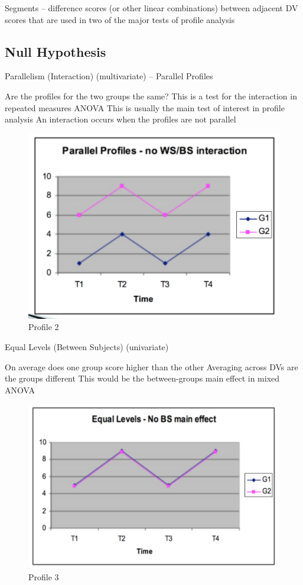 \documentclass[]{book}
\theoremstyle{definition}
\theoremstyle{definition}
\theoremstyle{definition}
\theoremstyle{remark}
\begin{document}
Segments -- difference scores (or other linear combinations) between
adjacent DV scores that are used in two of the major tests of profile
analysis

\subsection{Null Hypothesis}\label{null-hypothesis}

Parallelism (Interaction) (multivariate) -- Parallel Profiles

Are the profiles for the two groups the same? This is a test for the
interaction in repeated measures ANOVA This is usually the main test of
interest in profile analysis An interaction occurs when the profiles are
not parallel

\begin{figure}
\centering
\includegraphics{img/jhprofile2.png}
\caption{Profile 2}
\end{figure}

Equal Levels (Between Subjects) (univariate)

On average does one group score higher than the other Averaging across
DVs are the groups different This would be the between-groups main
effect in mixed ANOVA

\begin{figure}
\centering
\includegraphics{img/jhprofile3.png}
\caption{Profile 3}
\end{figure}
\end{document}
